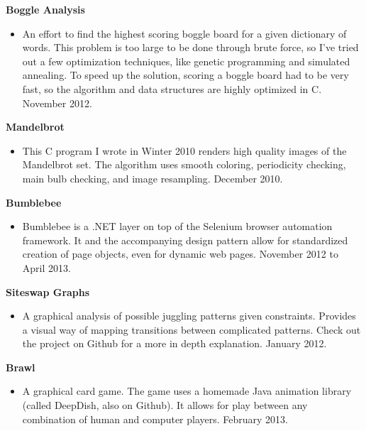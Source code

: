 \documentclass{res}
\begin{document}
\begin{resume}
{\bf Boggle Analysis}
       \begin{itemize}
        \item[] An effort to find the highest scoring boggle board for a given dictionary of words. This problem is too large to be done through brute force, so I've tried out a few optimization techniques, like genetic programming and simulated annealing. To speed up the solution, scoring a boggle board had to be very fast, so the algorithm and data structures are highly optimized in C. November 2012.

    \end{itemize}

  {\bf Mandelbrot}
        \begin{itemize}
        \item[] This C program I wrote in Winter 2010 renders high quality images of the Mandelbrot set. The algorithm uses smooth coloring, periodicity checking, main bulb checking, and image resampling. December 2010.

       \end{itemize}

  {\bf Bumblebee}
    \begin{itemize} %
      \item[] Bumblebee is a .NET layer on top of the Selenium browser automation framework. It and the accompanying design pattern allow for standardized creation of page objects, even for dynamic web pages. November 2012 to April 2013.

      \end{itemize}

   {\bf  Siteswap Graphs}
        \begin{itemize}
        \item[]  A graphical analysis of possible juggling patterns given constraints. Provides a visual way of mapping transitions between complicated patterns. Check out the project on Github for a more in depth explanation. January 2012.

       \end{itemize}

   {\bf Brawl}
        \begin{itemize}
        \item[] A graphical card game. The game uses a homemade Java animation library (called DeepDish, also on Github). It allows for play between any combination of human and computer players. February 2013.
        \end{itemize}
 
\end{resume}
\end{document}
